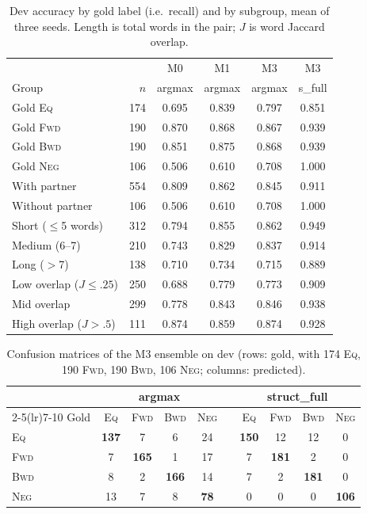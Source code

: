 \documentclass[10pt,a4paper,twocolumn]{article}
\newcommand{\Eq}{\textsc{Eq}}
\newcommand{\Fwd}{\textsc{Fwd}}
\newcommand{\Bwd}{\textsc{Bwd}}
\newcommand{\Neg}{\textsc{Neg}}
\begin{document}
\begin{table}[!t]
\centering
\footnotesize
\setlength{\tabcolsep}{2.0pt}
\begin{tabular}{l r cccc}
\toprule
& & M0 & M1 & M3 & M3 \\
Group & $n$ & argmax & argmax & argmax & s\_full \\
\midrule
Gold \Eq{} & 174 & 0.695 & 0.839 & 0.797 & 0.851 \\
Gold \Fwd{} & 190 & 0.870 & 0.868 & 0.867 & 0.939 \\
Gold \Bwd{} & 190 & 0.851 & 0.875 & 0.868 & 0.939 \\
Gold \Neg{} & 106 & 0.506 & 0.610 & 0.708 & 1.000 \\
\midrule
With partner & 554 & 0.809 & 0.862 & 0.845 & 0.911 \\
Without partner & 106 & 0.506 & 0.610 & 0.708 & 1.000 \\
\midrule
Short ($\le$5 words) & 312 & 0.794 & 0.855 & 0.862 & 0.949 \\
Medium (6--7) & 210 & 0.743 & 0.829 & 0.837 & 0.914 \\
Long ($>$7) & 138 & 0.710 & 0.734 & 0.715 & 0.889 \\
\midrule
Low overlap ($J{\le}.25$) & 250 & 0.688 & 0.779 & 0.773 & 0.909 \\
Mid overlap & 299 & 0.778 & 0.843 & 0.846 & 0.938 \\
High overlap ($J{>}.5$) & 111 & 0.874 & 0.859 & 0.874 & 0.928 \\
\bottomrule
\end{tabular}
\caption{Dev accuracy by gold label (i.e.\ recall) and by subgroup, mean of three seeds. Length is total words in the pair; $J$ is word Jaccard overlap.}
\label{tab:sub}
\end{table}

\begin{table}[!t]
\centering
\footnotesize
\setlength{\tabcolsep}{2.6pt}
\begin{tabular}{l cccc c cccc}
\toprule
& \multicolumn{4}{c}{argmax} & & \multicolumn{4}{c}{struct\_full} \\
\cmidrule(lr){2-5}\cmidrule(lr){7-10}
Gold & \Eq & \Fwd & \Bwd & \Neg & & \Eq & \Fwd & \Bwd & \Neg \\
\midrule
\Eq{} & \textbf{137} & 7 & 6 & 24 & & \textbf{150} & 12 & 12 & 0 \\
\Fwd{} & 7 & \textbf{165} & 1 & 17 & & 7 & \textbf{181} & 2 & 0 \\
\Bwd{} & 8 & 2 & \textbf{166} & 14 & & 7 & 2 & \textbf{181} & 0 \\
\Neg{} & 13 & 7 & 8 & \textbf{78} & & 0 & 0 & 0 & \textbf{106} \\
\bottomrule
\end{tabular}
\caption{Confusion matrices of the M3 ensemble on dev (rows: gold, with 174 \Eq, 190 \Fwd, 190 \Bwd, 106 \Neg; columns: predicted).}
\label{tab:cm}
\end{table}
\end{document}
